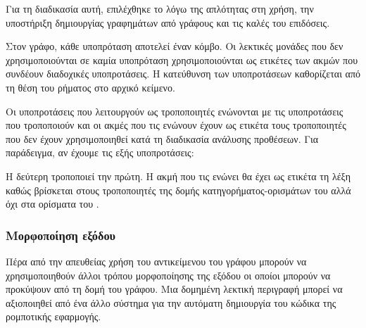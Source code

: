 Για τη διαδικασία αυτή, επιλέχθηκε το  λόγω της απλότητας στη χρήση, την υποστήριξη δημιουργίας γραφημάτων από γράφους και τις καλές του επιδόσεις.

Στον γράφο, κάθε υποπρόταση αποτελεί έναν κόμβο.
Οι λεκτικές μονάδες που δεν χρησιμοποιούνται σε καμία υποπρόταση χρησιμοποιούνται ως ετικέτες των ακμών που συνδέουν διαδοχικές υποπροτάσεις.
Η κατεύθυνση των υποπροτάσεων καθορίζεται από τη θέση του ρήματος στο αρχικό κείμενο.

Οι υποπροτάσεις που λειτουργούν ως τροποποιητές ενώνονται με τις υποπροτάσεις που τροποποιούν
και οι ακμές που τις ενώνουν έχουν ως ετικέτα τους τροποποιητές \ARGM{} που δεν έχουν χρησιμοποιηθεί κατά τη διαδικασία ανάλυσης προθέσεων.
Για παράδειγμα, αν έχουμε τις εξής υποπροτάσεις:
\begin{compactenum}
    \item {}
    \item {}
\end{compactenum}
Η δεύτερη τροποποιεί την πρώτη.
Η ακμή που τις ενώνει θα έχει ως ετικέτα τη λέξη  καθώς βρίσκεται στους τροποποιητές της δομής κατηγορήματος-ορισμάτων του  αλλά όχι στα ορίσματα του .

\subsubsection{Μορφοποίηση εξόδου}\label{subsec:4-format}
Πέρα από την απευθείας χρήση του αντικείμενου του γράφου μπορούν να χρησιμοποιηθούν άλλοι τρόπου μορφοποίησης της εξόδου οι οποίοι μπορούν να προκύψουν από τη δομή του γράφου.
Μια δομημένη λεκτική περιγραφή μπορεί να αξιοποιηθεί από ένα άλλο σύστημα για την αυτόματη δημιουργία του κώδικα της ρομποτικής εφαρμογής.

